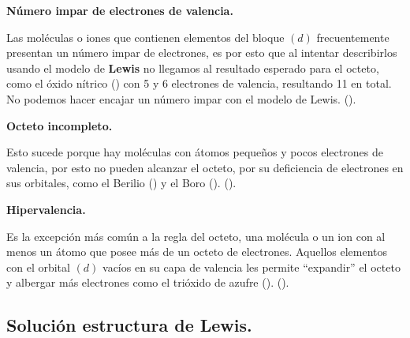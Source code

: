 \documentclass[a4paper,12pt]{article} %
\begin{document}
\vspace{\baselineskip}

\begin{justify}
    \textbf{Número impar de electrones de valencia.}
\end{justify}
\begin{justify}
    Las moléculas o iones que contienen elementos del bloque \((d)\) frecuentemente presentan un número impar de electrones, es por esto que al intentar describirlos usando el modelo de \textbf{Lewis} no llegamos al resultado esperado para el octeto,
    como el óxido nítrico () con 5 y 6 electrones de valencia, resultando 11 en total.
    No podemos hacer encajar un número impar con el modelo de Lewis. (\cite{Octeto}).
\end{justify}

\vspace{\baselineskip}

\begin{justify}
    \textbf{Octeto incompleto.}
\end{justify}

\begin{justify}
    Esto sucede porque hay moléculas con átomos pequeños y pocos electrones de valencia, por esto no pueden alcanzar el octeto, por su deficiencia de electrones 
    en sus orbitales, como el Berilio () y el Boro (). (\cite{Octeto}).
\end{justify}

\vspace{\baselineskip}

\begin{justify}
    \textbf{Hipervalencia.}
\end{justify}
\begin{justify}
    Es la excepción más común a la regla del octeto, una molécula o un ion con al menos un átomo que posee más de un octeto de electrones.
    Aquellos elementos con el orbital \((d)\) vacíos en su capa de valencia les permite ``expandir'' el octeto y albergar más electrones como 
    el trióxido de azufre (). (\cite{Octeto}).
\end{justify}

\newpage 


\subsection{Solución estructura de Lewis.}

\vspace{\baselineskip}
\end{document}
